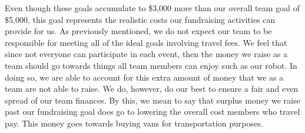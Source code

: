 Even though these goals accumulate to \$3,000 more than our overall team goal of \$5,000, this goal represents the realistic costs our fundraising activities can provide for us. As previously mentioned, we do not expect our team to be responsible for meeting all of the ideal goals involving travel fees. We feel that since not everyone can participate in each event, then the money we raise as a team should go towards things all team members can enjoy such as our robot. In doing so, we are able to account for this extra amount of money that we as a team are not able to raise. We do, however, do our best to ensure a fair and even spread of our team finances. By this, we mean to say that surplus money we raise past our fundraising goal does go to lowering the overall cost members who travel pay. This money goes towards buying vans for transportation purposes. 


